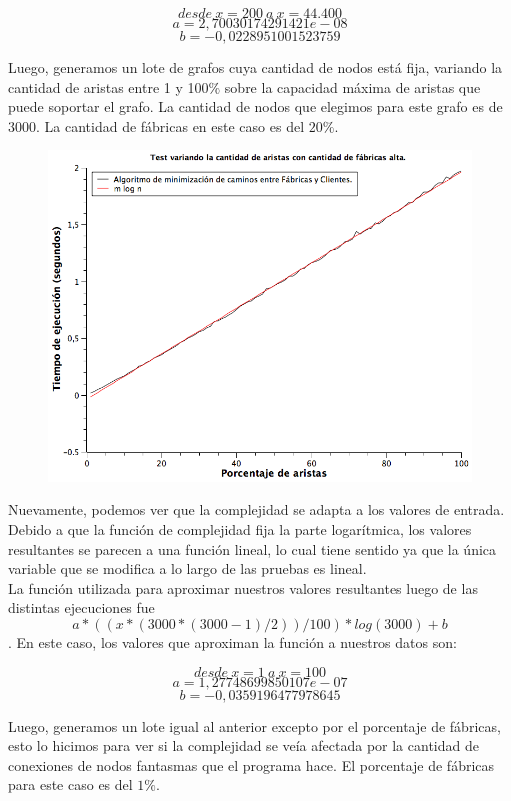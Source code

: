 $$desde\ x = 200\ a\ x = 44.400 $$
$$a  = 2,70030174291421e-08$$
$$b  = -0,0228951001523759 $$


\newpage
Luego, generamos un lote de grafos cuya cantidad de nodos está fija, variando la cantidad de aristas entre 1 y 100$\%$ sobre la capacidad máxima de aristas que puede soportar el grafo. La cantidad de nodos que elegimos para este grafo es de $3000$. La cantidad de fábricas en este caso es del $20\%$.

\begin{figure}[H]
\begin{center}
	\includegraphics[width=350pt]{../tests/ej3/EJ3-r-var-denso.png}
\end{center}
\end{figure}

Nuevamente, podemos ver que la complejidad se adapta a los valores de entrada. Debido a que la función de complejidad fija la parte logarítmica, los valores resultantes se parecen a una función lineal, lo cual tiene sentido ya que la única variable que se modifica a lo largo de las pruebas es lineal.\\
La función utilizada para aproximar nuestros valores resultantes luego de las distintas ejecuciones fue $$a*((x*(3000*(3000-1)/2))/100)*log(3000)+b $$.
En este caso, los valores que aproximan la función a nuestros datos son:

$$desde\ x = 1\ a\ x = 100 $$
$$a  = 1,27748699850107e-07$$
$$b  = -0,0359196477978645 $$

\newpage
Luego, generamos un lote igual al anterior excepto por el porcentaje de fábricas, esto lo hicimos para ver si la complejidad se veía afectada por la cantidad de conexiones de nodos fantasmas que el programa hace. El porcentaje de fábricas para este caso es del $1\%$.

